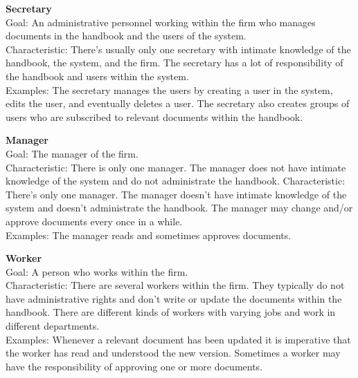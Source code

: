 \textbf{Secretary}
\\
Goal: An administrative personnel working within the firm who manages documents in the handbook and the users of the system.
\\%
Characteristic: There’s usually only one secretary with intimate knowledge of the handbook, the system, and the firm. 
The secretary has a lot of responsibility of the handbook and users within the system.
\\%
Examples: The secretary manages the users by creating a user in the system, edits the user, and eventually deletes a user.
The secretary also creates groups of users who are subscribed to relevant documents within the handbook.

\textbf{Manager}
\\%
Goal: The manager of the firm.
\\
Characteristic: There is only one manager.
The manager does not have intimate knowledge of the system and do not administrate the handbook.
Characteristic: There’s only one manager. 
The manager doesn’t have intimate knowledge of the system and doesn’t administrate the handbook.
The manager may change and/or approve documents every once in a while.
\\
Examples: The manager reads and sometimes approves documents.

\textbf{Worker}
\\
Goal: A person who works within the firm.
\\%
Characteristic: There are several workers within the firm. 
They typically do not have administrative rights and don’t write or update the documents within the handbook. 
There are different kinds of workers with varying jobs and work in different departments.
\\
Examples: Whenever a relevant document has been updated it is imperative that the worker has read and understood the new version.
Sometimes a worker may have the responsibility of approving one or more documents.

